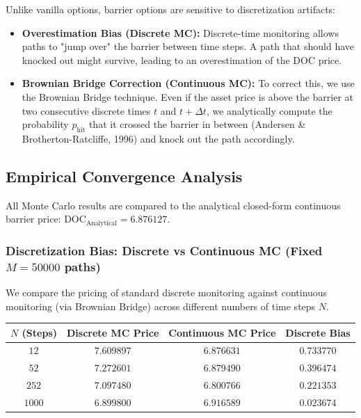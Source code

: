 \documentclass{report}
\begin{document}
Unlike vanilla options, barrier options are sensitive to discretization artifacts:

\begin{itemize}
    \item \textbf{Overestimation Bias (Discrete MC):} Discrete-time monitoring allows paths to "jump over" the barrier between time steps. A path that should have knocked out might survive, leading to an overestimation of the DOC price.
    \item \textbf{Brownian Bridge Correction (Continuous MC):} To correct this, we use the Brownian Bridge technique. Even if the asset price is above the barrier at two consecutive discrete times $t$ and $t+\Delta t$, we analytically compute the probability $p_{\text{hit}}$ that it crossed the barrier in between (Andersen \& Brotherton-Ratcliffe, 1996) and knock out the path accordingly.
\end{itemize}

\subsection{Empirical Convergence Analysis}

All Monte Carlo results are compared to the analytical closed-form continuous barrier price: $\text{DOC}_{\text{Analytical}} = 6.876127$.

\subsubsection{Discretization Bias: Discrete vs Continuous MC (Fixed $M = 50000$ paths)}

We compare the pricing of standard discrete monitoring against continuous monitoring (via Brownian Bridge) across different numbers of time steps $N$.

\begin{center}
\begin{tabular}{cccc}
\toprule
$N$ (Steps) & Discrete MC Price & Continuous MC Price & Discrete Bias \\
\midrule
$12$ & $7.609897$ & $6.876631$ & $0.733770$ \\
$52$ & $7.272601$ & $6.879490$ & $0.396474$ \\
$252$ & $7.097480$ & $6.800766$ & $0.221353$ \\
$1000$ & $6.899800$ & $6.916589$ & $0.023674$ \\
\bottomrule
\end{tabular}
\end{center}
\end{document}
